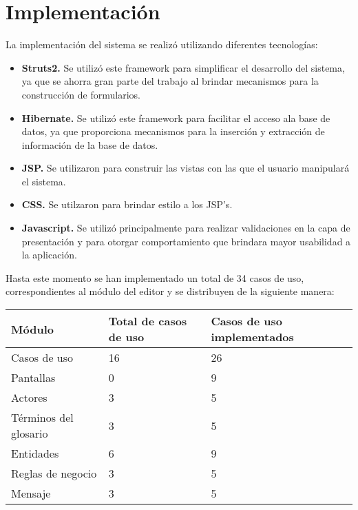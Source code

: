 \section{Implementación}

La implementación del sistema se realizó utilizando diferentes tecnologías:

\begin{itemize}
 \item {\bf Struts2.}  Se utilizó este framework para simplificar el desarrollo del sistema, ya que se ahorra gran parte del trabajo al brindar mecanismos para la construcción de formularios.
 \item {\bf Hibernate.}  Se utilizó este framework para facilitar el acceso ala base de datos, ya que proporciona mecanismos para la inserción y extracción de información de la base de datos.
 \item {\bf JSP.}  Se utilizaron para construir las vistas con las que el usuario manipulará el sistema.
 \item {\bf CSS.} Se utilzaron para brindar estilo a los JSP's.
 \item {\bf Javascript.} Se utilizó principalmente para realizar validaciones en la capa de presentación y para otorgar comportamiento que brindara mayor usabilidad a la aplicación.
\end{itemize}


\newpage
Hasta este momento se han implementado un total de 34 casos de uso, correspondientes al módulo del editor y se distribuyen de la siguiente manera:

 \begin{longtable}{| p{} | p{} | p{} |}%
		\arrayrulecolor{black}%
		\rowcolor{black}%
		\color{white}Módulo  &  \color{white}Total de casos de uso & \color{white}Casos de uso implementados\\ \hline
		\endhead%
		\arrayrulecolor{black}
		Casos de uso & 16 & 26\\ \hline 
		Pantallas & 0 & 9\\ \hline
		Actores & 3 & 5\\ \hline
		Términos del glosario & 3 & 5\\ \hline
		Entidades & 6 & 9\\ \hline
		Reglas de negocio & 3 & 5\\ \hline
		Mensaje & 3 & 5\\ \hline


\end{longtable}
